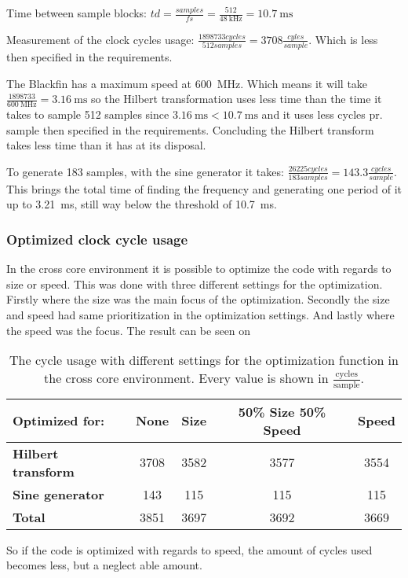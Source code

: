 Time between sample blocks:
$td = \frac{samples}{fs} = \frac{512}{\SI{48}{\kilo\hertz}} = \SI{10.7}{\milli\second}$

Measurement of the clock cycles usage:
$\frac{1898733 cycles}{512 samples} = 3708 \frac{cyles}{sample}$.
Which is less then specified in the requirements.

The Blackfin has a maximum speed at \SI{600}{\mega\hertz}.
Which means it will take $\frac{\num{1898733}}{\SI{600}{\mega\hertz}} = {\SI{3.16}{\milli\second}}$ so the Hilbert transformation uses less time than the time it takes to sample 512 samples since $\SI{3.16}{\milli\second} < \SI{10.7}{\milli\second}$ and it uses less cycles pr. sample then specified in the requirements.
Concluding the Hilbert transform takes less time than it has at its disposal.

To generate 183 samples, with the sine generator it takes: $\frac{\num{26225} cycles}{183 samples} = \num{143.3}\frac{cycles}{sample}$.
This brings the total time of finding the frequency and generating one period of it up to \SI{3.21}{\milli\second}, still way below the threshold of \SI{10.7}{\milli\second}.

\subsubsection{Optimized clock cycle usage}
In the cross core environment it is possible to optimize the code with regards to size or speed.
This was done with three different settings for the optimization. 
Firstly where the size was the main focus of the optimization. 
Secondly the size and speed had same prioritization in the optimization settings.
And lastly where the speed was the focus. The result can be seen on
\begin{table}
	\centering
	\begin{tabularx}{0.95\textwidth}{l c c c c}
		\toprule
		{\textbf{Optimized for:}} & \textbf{None} & \textbf{Size} & \textbf{50\% Size 50\% Speed} & \textbf{Speed} \\
		\midrule
		\textbf{Hilbert transform} & \num{3708} & \num{3582} & \num{3577} & \num{3554} \\
		\textbf{Sine generator} & \num{143} & \num{115} & \num{115} & \num{115} \\
		\textbf{Total} & \num{3851} & \num{3697} & \num{3692} & \num{3669} \\
		\bottomrule
	\end{tabularx}
	\caption{The cycle usage with different settings for the optimization function in the cross core environment. Every value is shown in $\frac{\text{cycles}}{\text{sample}}$.}
	\label{OptimizedCycleUsage}
\end{table}

So if the code is optimized with regards to speed, the amount of cycles used becomes less, but a neglect able amount.  

\FloatBarrier